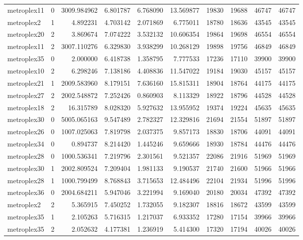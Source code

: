 \begin{longtable}{|l|r|r|r|r|r|r|r|r|r|}
metroplex11 & 0 & 3009.984962 & 6.801787 & 6.768090 & 13.569877 & 19830 & 19688 & 46747 & 46747 \\
metroplex2 & 1 & 4.892231 & 4.703142 & 2.071869 & 6.775011 & 18780 & 18636 & 43545 & 43545 \\
metroplex20 & 2 & 3.869674 & 7.074222 & 3.532132 & 10.606354 & 19864 & 19698 & 46554 & 46554 \\
metroplex11 & 2 & 3007.110276 & 6.329830 & 3.938299 & 10.268129 & 19898 & 19756 & 46849 & 46849 \\
metroplex35 & 0 & 2.000000 & 6.418738 & 1.358795 & 7.777533 & 17236 & 17110 & 39900 & 39900 \\
metroplex10 & 2 & 6.298246 & 7.138186 & 4.408836 & 11.547022 & 19184 & 19030 & 45157 & 45157 \\
metroplex21 & 1 & 2009.583960 & 8.179151 & 7.636160 & 15.815311 & 18904 & 18764 & 44175 & 44175 \\
metroplex27 & 2 & 2002.548872 & 7.252426 & 0.860903 & 8.113329 & 18922 & 18796 & 44528 & 44528 \\
metroplex18 & 2 & 16.315789 & 8.028320 & 5.927632 & 13.955952 & 19374 & 19224 & 45635 & 45635 \\
metroplex30 & 0 & 5005.065163 & 9.547489 & 2.782327 & 12.329816 & 21694 & 21554 & 51897 & 51897 \\
metroplex26 & 0 & 1007.025063 & 7.819798 & 2.037375 & 9.857173 & 18830 & 18706 & 44091 & 44091 \\
metroplex34 & 0 & 0.894737 & 8.214420 & 1.445246 & 9.659666 & 18930 & 18784 & 44476 & 44476 \\
metroplex28 & 0 & 1000.536341 & 7.219796 & 2.301561 & 9.521357 & 22086 & 21916 & 51969 & 51969 \\
metroplex30 & 1 & 2002.809524 & 7.209404 & 1.981133 & 9.190537 & 21740 & 21600 & 51966 & 51966 \\
metroplex28 & 1 & 1000.799499 & 8.768843 & 3.715653 & 12.484496 & 22104 & 21934 & 51996 & 51996 \\
metroplex36 & 0 & 2004.684211 & 5.947046 & 3.221994 & 9.169040 & 20180 & 20034 & 47392 & 47392 \\
metroplex2 & 2 & 5.365915 & 7.450252 & 1.732055 & 9.182307 & 18816 & 18672 & 43599 & 43599 \\
metroplex35 & 1 & 2.105263 & 5.716315 & 1.217037 & 6.933352 & 17280 & 17154 & 39966 & 39966 \\
metroplex35 & 2 & 2.052632 & 4.177381 & 1.236919 & 5.414300 & 17320 & 17194 & 40026 & 40026 \\

\end{longtable}
